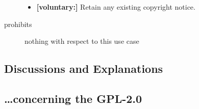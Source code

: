\begin{description}
\begin{itemize}
  

  \item \textbf{[voluntary:]} Retain any existing copyright notice. 
  
\end{itemize}

\item[prohibits] nothing with respect to this use case

\end{description}

\subsection{Discussions and Explanations}
\subsection{\ldots concerning the GPL-2.0}

